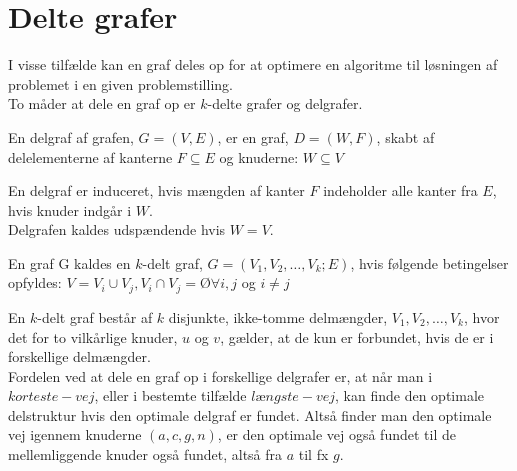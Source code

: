 \section{Delte grafer}
I visse tilfælde kan en graf deles op for at optimere en algoritme til løsningen af problemet i en given problemstilling. \\
To måder at dele en graf op er $k$-delte grafer og delgrafer.

\begin{defn}	 \label{defn:delgraf} %
En delgraf af grafen, $G= (V,E)$, er en graf, $D = (W,F)$, skabt af delelementerne af kanterne $F \subseteq E$ og knuderne: $W \subseteq V$
\end{defn}

En delgraf er induceret, hvis mængden af kanter $F$ indeholder alle kanter fra $E$, hvis knuder indgår i $W$. \\

Delgrafen kaldes udspændende hvis $W=V$. 


\begin{defn} \label{defn:k-delt} %
En graf G kaldes en $k$-delt graf, $G = (V_1, V_2, \ldots, V_k; E)$, hvis følgende betingelser opfyldes: $V= V_i \cup V_j , V_i \cap V_j = Ø \forall i,j$ og $i\neq j$ 
\end{defn}

En $k$-delt graf består af $k$ disjunkte, ikke-tomme delmængder, $V_1, V_2, \ldots, V_k$, hvor det for to vilkårlige knuder, $u$ og $v$, gælder, at de kun er forbundet, hvis de er i forskellige delmængder. \\


Fordelen ved at dele en graf op i forskellige delgrafer er, at når man i $korteste-vej$, eller i bestemte tilfælde $længste-vej$, kan finde den optimale delstruktur hvis den optimale delgraf er fundet. Altså finder man den optimale vej igennem knuderne $(a, c, g, n)$, er den optimale vej også fundet til de mellemliggende knuder også fundet, altså fra $a$ til fx $g$.
